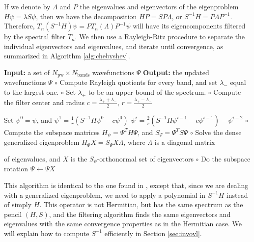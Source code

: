 \documentclass[11pt]{elsarticle}
\newcommand{\npw}{\ensuremath{N_{\text{pw}}}\xspace}
\newcommand{\nline}{\ensuremath{n_{\text{inner}}}\xspace}
\newcommand{\nband}{\ensuremath{N_{\text{bands}}}\xspace}
\begin{document}
If we denote by $\Lambda$ and $P$ the eigenvalues and eigenvectors of
the eigenproblem $H\psi = \lambda S \psi$, then we have the
decomposition $H P = S P \Lambda$, or $S^{-1} H = P \Lambda
P^{-1}$. Therefore, $T_{n}(S^{-1}H) \psi = P T_{n}(\Lambda) P^{-1}
\psi$ will have its eigencomponents filtered by the spectral filter
$T_{n}$. We then use a Rayleigh-Ritz procedure to separate the
individual eigenvectors and eigenvalues, and iterate until
convergence, as summarized in Algorithm \ref{alg:chebyshev}.

\begin{framed}
  \begin{algorithm}[H]
    \caption{Chebyshev filtering}
    \begin{algorithmic}
      \STATE \textbf{Input:} a set of $\npw \times \nband$
      wavefunctions $\Psi$
      \STATE \textbf{Output:} the updated  wavefunctions $\Psi$
      \STATE $\circ$ Compute Rayleigh quotients for every band, and set
      $\lambda_{-}$ equal to the largest one.
      \STATE $\circ$ Set $\lambda_{+}$ to be an
      upper bound of the spectrum.
      \STATE $\circ$ Compute the filter center and radius $c =
      \frac {\lambda_{+}+\lambda_{-}}2$, $r = \frac
      {\lambda_{+}-\lambda_{-}}2$

      \STATE Set $\psi^{0} = \psi$, and $\psi^{1} = \frac 1 r (S^{-1} H \psi^{0} - c \psi^{0})$
      \FOR {$i = 2, \dots, \nline$}
      \STATE $\psi^{i} = \frac 2 r (S^{-1} H \psi^{i-1} - c \psi^{i-1}) - \psi^{i-2}$
      \ENDFOR
      \ENDFOR
      \STATE $\circ$ Compute the subspace matrices $H_{\psi} = \Psi^{T} H \Psi$,
      and $S_{\Psi} = \Psi^{T} S \Psi$
      \STATE $\circ$ Solve the dense generalized eigenproblem $H_{\Psi} X = S_{\Psi} X
      \Lambda$, where $\Lambda$ is a diagonal matrix

      of eigenvalues, and $X$ is the $S_{\psi}$-orthonormal set of
      eigenvectors
      \STATE $\circ$ Do the subspace rotation $\Psi
      \leftarrow \Psi X$
    \end{algorithmic}
    \label{alg:chebyshev}
  \end{algorithm}
\end{framed}

This algorithm is identical to the one found in \cite{seq_chebfi},
except that, since we are dealing with a generalized eigenproblem, we
need to apply a polynomial in $S^{-1} H$ instead of simply $H$. This
operator is not Hermitian, but has the same spectrum as the pencil
$(H,S)$, and the filtering algorithm finds the same eigenvectors and
eigenvalues with the same convergence properties as in the Hermitian
case. We will explain how to compute $S^{-1}$ efficiently in Section
\ref{sec:invovl}.
\end{document}
